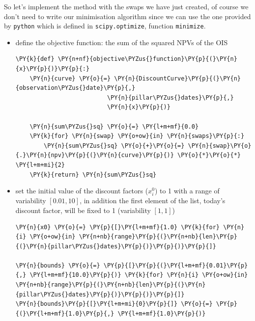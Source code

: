 So let's implement the method with the swaps we have just created, of course we don't need to write our minimisation algorithm since we can use the one provided by \texttt{python} which is defined in \texttt{scipy.optimize}, function \texttt{minimize}.

\begin{itemize}
\tightlist
\item
  define the objective function: the sum of the squared NPVs of the OIS

    \begin{tcolorbox}[breakable, size=fbox, boxrule=1pt, pad at break*=1mm,colback=cellbackground, colframe=cellborder]
\begin{Verbatim}[commandchars=\\\{\}]
\PY{k}{def} \PY{n+nf}{objective\PYZus{}function}\PY{p}{(}\PY{n}{x}\PY{p}{)}\PY{p}{:}
    \PY{n}{curve} \PY{o}{=} \PY{n}{DiscountCurve}\PY{p}{(}\PY{n}{observation\PYZus{}date}\PY{p}{,}
                          \PY{n}{pillar\PYZus{}dates}\PY{p}{,}
                          \PY{n}{x}\PY{p}{)}
    
    \PY{n}{sum\PYZus{}sq} \PY{o}{=} \PY{l+m+mf}{0.0}
    \PY{k}{for} \PY{n}{swap} \PY{o+ow}{in} \PY{n}{swaps}\PY{p}{:}
        \PY{n}{sum\PYZus{}sq} \PY{o}{+}\PY{o}{=} \PY{n}{swap}\PY{o}{.}\PY{n}{npv}\PY{p}{(}\PY{n}{curve}\PY{p}{)} \PY{o}{*}\PY{o}{*} \PY{l+m+mi}{2}
    \PY{k}{return} \PY{n}{sum\PYZus{}sq}
\end{Verbatim}
\end{tcolorbox}

\item
  set the initial value of the discount factors (\(x_i^0\)) to 1 with a
  range of variability \([ 0.01, 10]\), in addition the first element of
  the list, today's discount factor, will be fixed to 1 (variability
  \([1, 1]\))

    \begin{tcolorbox}[breakable, size=fbox, boxrule=1pt, pad at break*=1mm,colback=cellbackground, colframe=cellborder]
\begin{Verbatim}[commandchars=\\\{\}]
\PY{n}{x0} \PY{o}{=} \PY{p}{[}\PY{l+m+mf}{1.0} \PY{k}{for} \PY{n}{i} \PY{o+ow}{in} \PY{n+nb}{range}\PY{p}{(}\PY{n+nb}{len}\PY{p}{(}\PY{n}{pillar\PYZus{}dates}\PY{p}{)}\PY{p}{)}\PY{p}{]}

\PY{n}{bounds} \PY{o}{=} \PY{p}{[}\PY{p}{(}\PY{l+m+mf}{0.01}\PY{p}{,} \PY{l+m+mf}{10.0}\PY{p}{)} \PY{k}{for} \PY{n}{i} \PY{o+ow}{in} \PY{n+nb}{range}\PY{p}{(}\PY{n+nb}{len}\PY{p}{(}\PY{n}{pillar\PYZus{}dates}\PY{p}{)}\PY{p}{)}\PY{p}{]}
\PY{n}{bounds}\PY{p}{[}\PY{l+m+mi}{0}\PY{p}{]} \PY{o}{=} \PY{p}{(}\PY{l+m+mf}{1.0}\PY{p}{,} \PY{l+m+mf}{1.0}\PY{p}{)}
\end{Verbatim}
\end{tcolorbox}


\end{itemize}
